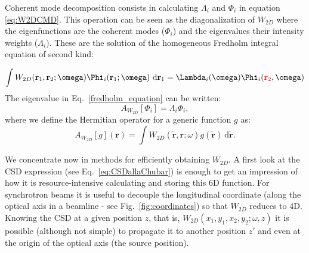 \documentclass{iucr}              %
\newcommand{\inred}[1]{{\color{red}#1}}
\begin{document}
Coherent mode decomposition consists in calculating $\Lambda_i$ and $\Phi_i$ in equation \ref{eq:W2DCMD}. This operation can be seen as the diagonalization of $W_{2D}$ where the eigenfunctions are the coherent modes ($\Phi_i$) and the eigenvalues their intensity weights ($\Lambda_i$). These are the solution of the homogeneous Fredholm integral equation of second kind:

\begin{equation}\label{fredholm_equation}
\int W_{2D}(\textbf{r}_1,\textbf{r}_2;\omega)
\Phi_i(\textbf{r}_1;\omega)~\text{d}\textbf{r}_1  = \Lambda_i(\omega) \Phi_i(\inred{\textbf{r}_2},\omega)
\end{equation}
The eigenvalue in Eq.~\ref{fredholm_equation} can be written: 
\begin{equation}
A_{W_{2D}}[\Phi_i] = \Lambda_i \Phi_i,
\end{equation}
where we define the Hermitian operator for a generic function $g$ as:
\begin{equation}\label{eq:Hermitian}
A_{W_{2D}}[g](\textbf{r})  = \int W_{2D}(\tilde{\textbf{r}},\textbf{r};\omega) g(\tilde{\textbf{r}})~ \text{d}\tilde{\textbf{r}}.
\end{equation}

We concentrate now in methods for efficiently obtaining $W_{2D}$. A first look at the CSD expression (see Eq.~\ref{eq:CSDallaChubar}) is enough to get an impression of how it is resource-intensive calculating and storing this 6D function. For synchrotron beams it is useful to decouple the longitudinal coordinate (along the optical axis in a beamline - see Fig.~\ref{fig:coordinates}) so that $W_{2D}$ reduces to 4D. Knowing the CSD at a given position $z$, that is, $W_{2D}(x_1,y_1,x_2,y_2; \omega, z)$ it is possible (although not simple) to propagate it to another position $z'$ and even at the origin of the optical axis (the source position).
\end{document}
